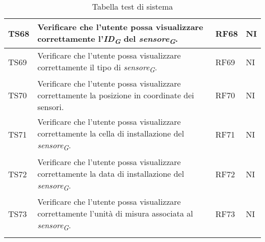 \begin{longtable}{|C{1.9cm}|L{5cm}|C{2cm}|C{2cm}|}
    TS68 & Verificare che l'utente possa visualizzare correttamente l'\textit{ID}\textsubscript{\textit{G}} del \textit{sensore}\textsubscript{\textit{G}}. & RF68 & NI \\
    \hline

    TS69 & Verificare che l'utente possa visualizzare correttamente il tipo di \textit{sensore}\textsubscript{\textit{G}}. & RF69 & NI \\
    \hline

    TS70 & Verificare che l'utente possa visualizzare correttamente la posizione in coordinate dei sensori. & RF70 & NI \\
    \hline

    TS71 & Verificare che l'utente possa visualizzare correttamente la cella di installazione del \textit{sensore}\textsubscript{\textit{G}}. & RF71 & NI \\
    \hline

    TS72 & Verificare che l'utente possa visualizzare correttamente la data di installazione del \textit{sensore}\textsubscript{\textit{G}}. & RF72 & NI \\
    \hline

    TS73 & Verificare che l'utente possa visualizzare correttamente l'unità di misura associata al \textit{sensore}\textsubscript{\textit{G}}. & RF73 & NI \\
    \hline

    \caption{Tabella test di sistema}
\end{longtable}

\pagebreak